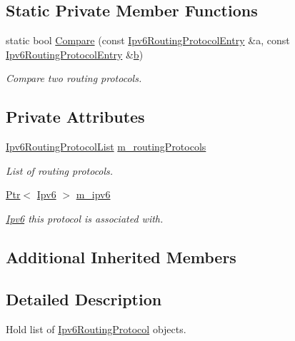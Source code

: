 \subsection*{Static Private Member Functions}
\begin{DoxyCompactItemize}
\item 
static bool \hyperlink{classns3_1_1Ipv6ListRouting_a3a0763f9854cedc4a231ba253ea2e418}{Compare} (const \hyperlink{classns3_1_1Ipv6ListRouting_a319efc7e5387bd5e2ca63ffe82daa15d}{Ipv6\+Routing\+Protocol\+Entry} \&a, const \hyperlink{classns3_1_1Ipv6ListRouting_a319efc7e5387bd5e2ca63ffe82daa15d}{Ipv6\+Routing\+Protocol\+Entry} \&\hyperlink{lte__pathloss_8m_a21ad0bd836b90d08f4cf640b4c298e7c}{b})
\begin{DoxyCompactList}\small\item\em Compare two routing protocols. \end{DoxyCompactList}\end{DoxyCompactItemize}
\subsection*{Private Attributes}
\begin{DoxyCompactItemize}
\item 
\hyperlink{classns3_1_1Ipv6ListRouting_ac06678936e0664598621368bbfa8f6de}{Ipv6\+Routing\+Protocol\+List} \hyperlink{classns3_1_1Ipv6ListRouting_aec46de403a1c73088ce952d7cbd804e8}{m\+\_\+routing\+Protocols}
\begin{DoxyCompactList}\small\item\em List of routing protocols. \end{DoxyCompactList}\item 
\hyperlink{classns3_1_1Ptr}{Ptr}$<$ \hyperlink{classns3_1_1Ipv6}{Ipv6} $>$ \hyperlink{classns3_1_1Ipv6ListRouting_af82ea298d92eb8cfcb6c7572e32b517d}{m\+\_\+ipv6}
\begin{DoxyCompactList}\small\item\em \hyperlink{classns3_1_1Ipv6}{Ipv6} this protocol is associated with. \end{DoxyCompactList}\end{DoxyCompactItemize}
\subsection*{Additional Inherited Members}


\subsection{Detailed Description}
Hold list of \hyperlink{classns3_1_1Ipv6RoutingProtocol}{Ipv6\+Routing\+Protocol} objects. 

